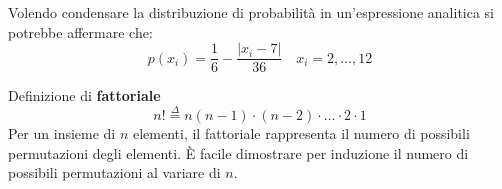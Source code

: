 Volendo condensare la distribuzione di probabilità in un'espressione analitica
si potrebbe affermare che:
$$
p(x_i) = \frac{1}{6} - \frac{|x_i-7|}{36}\quad x_i=2,\ldots,12
$$

Definizione di \textbf{fattoriale}
$$
n! \stackrel{\Delta}{=} n(n-1)\cdot(n-2)\cdot\ldots\cdot2\cdot1
$$
Per un insieme di $n$ elementi, il fattoriale rappresenta il numero di 
possibili permutazioni degli elementi.
È facile dimostrare per induzione il numero di possibili permutazioni al 
variare di $n$.

